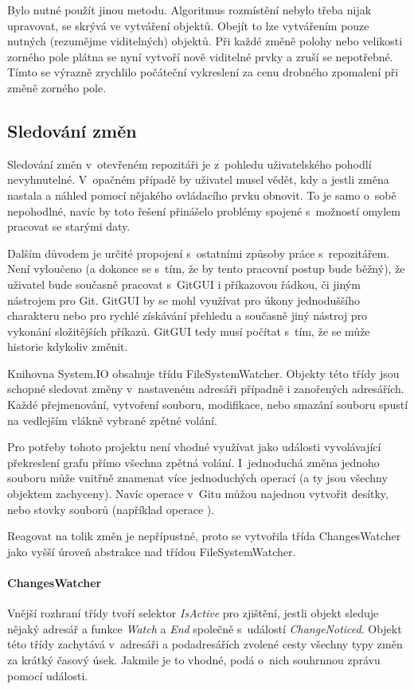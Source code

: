\documentclass[
  biblatex,
  glossaries,
  index
]{kidiplom}
\begin{document}
Bylo nutné použít jinou metodu. Algoritmus rozmístění nebylo třeba nijak upravovat,  se skrývá ve vytváření objektů. Obejít to lze vytvářením pouze nutných (rezumějme viditelných) objektů. Při každé změně polohy nebo velikosti zorného pole plátna se nyní vytvoří nově viditelné prvky a zruší se nepotřebné. Tímto se výrazně zrychlilo počáteční vykreslení za cenu drobného zpomalení při změně zorného pole.

\subsection{Sledování změn}
Sledování změn v~otevřeném repozitáři je z~pohledu uživatelského pohodlí nevyhnutelné. V~opačném případě by uživatel musel vědět, kdy a jestli změna nastala a náhled pomocí nějakého ovládacího prvku obnovit. To je samo o~sobě nepohodlné, navíc by toto řešení přinášelo problémy spojené s~možností omylem pracovat se starými daty.

Dalším důvodem je určité propojení s~ostatními způsoby práce s~repozitářem. Není vyloučeno (a dokonce se s~tím, že by tento pracovní postup bude běžný), že uživatel bude současně pracovat s~GitGUI i příkazovou řádkou, či jiným nástrojem pro Git. GitGUI by se mohl využívat pro úkony jednoduššího charakteru nebo pro rychlé získávání přehledu a současně jiný nástroj pro vykonání složitějších příkazů.
GitGUI tedy musí počítat s~tím, že se může historie kdykoliv změnit.

Knihovna System.IO obsahuje třídu FileSystemWatcher. Objekty této třídy jsou schopné sledovat změny v~nastaveném adresáři případně i zanořených adresářích. Každé přejmenování, vytvoření souboru, modifikace, nebo smazání souboru spustí na vedlejším vlákně vybrané zpětné volání.

Pro potřeby tohoto projektu není vhodné využívat jako události vyvolávající překreslení grafu přímo všechna zpětná volání. I~jednoduchá změna jednoho souboru může vnitřně znamenat více jednoduchých operací (a ty jsou všechny objektem zachyceny). Navíc operace v~Gitu můžou najednou vytvořit desítky, nebo stovky souborů (například operace ).

Reagovat na tolik změn je nepřípustné, proto se vytvořila třída ChangesWatcher jako vyšší úroveň abstrakce nad třídou FileSystemWatcher.

\paragraph*{ChangesWatcher}
Vnější rozhraní třídy tvoří selektor {\it IsActive} pro zjištění, jestli objekt sleduje nějaký adresář a funkce {\it Watch} a {\it End} společně s~událostí {\it ChangeNoticed}. Objekt této třídy zachytává v~adresáři a podadresářích zvolené cesty všechny typy změn za krátký časový úsek. Jakmile je to vhodné, podá o~nich souhrnnou zprávu pomocí události.
\end{document}
